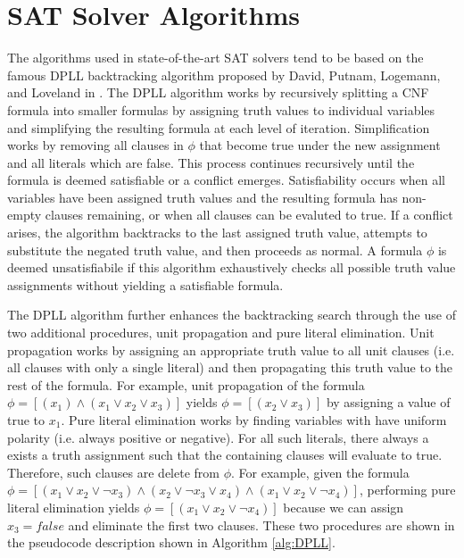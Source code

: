 \documentclass[paper=a4, fontsize=11pt]{scrartcl} %
\begin{document}
\section{SAT Solver Algorithms}
The algorithms used in state-of-the-art SAT solvers tend to be based on the famous
DPLL backtracking algorithm proposed by David, Putnam, Logemann, and Loveland in \cite{DPLL}.
The DPLL algorithm works by recursively splitting a CNF formula into smaller formulas
by assigning truth values to individual variables and simplifying the resulting
formula at each level of iteration. Simplification works by removing all clauses in $\phi$ that
become true under the new assignment and all literals which are false. 
This process continues recursively until the formula is deemed satisfiable
or a conflict emerges. Satisfiability occurs when all variables have been assigned truth values 
and the resulting formula has non-empty clauses remaining, or when all clauses can be
evaluted to true. If a conflict arises, the algorithm backtracks to
the last assigned truth value, attempts to substitute the negated truth value, and then proceeds
as normal. A formula $\phi$ is deemed unsatisfiabile if this algorithm exhaustively
checks all possible truth value assignments without yielding a satisfiable formula. 

The DPLL algorithm further enhances the backtracking search through the use of two additional
procedures, unit propagation and pure literal elimination. Unit propagation works by assigning
an appropriate truth value to all unit clauses (i.e. all clauses with only a single literal) and
then propagating this truth value to the rest of the formula. For example, unit propagation
of the formula $\phi = [(x_1) \land (x_1 \lor x_2 \lor x_3)]$ yields $\phi = [(x_2 \lor x_3)]$ by
assigning a value of true to $x_1$. Pure literal elimination works by finding variables
with have uniform polarity (i.e. always positive or negative). For all such literals, there
always a exists a truth assignment such that the containing clauses will evaluate to true.
Therefore, such clauses are delete from $\phi$. For example, given the formula 
$\phi = [(x_1 \lor x_2 \lor \lnot x_3) \land (x_2 \lor \lnot x_3 \lor x_4) \land (x_1 \lor x_2 \lor \lnot x_4)]$,
performing pure literal elimination yields 
$\phi = [(x_1 \lor x_2 \lor \lnot x_4)]$ because we can assign $x_3 = false$ and eliminate
the first two clauses. These two procedures are shown in the pseudocode description shown
in Algorithm \ref{alg:DPLL}.
\end{document}
